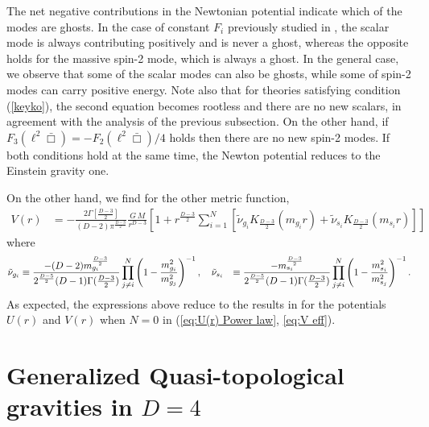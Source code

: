 \documentclass[11pt]{article}
\newcommand{\comment}[1]{{\bf [[[#1]]]}}
\begin{document}
{The net negative contributions in the Newtonian potential indicate which of the modes are ghosts. In the case of constant $F_i$ previously studied in \cite{Aspects,Sisman:2011gz}, the scalar mode is always contributing positively and is never a ghost, whereas the opposite holds for the massive spin-2 mode, which is always a ghost. In the general case, we observe that some of the scalar modes can also be ghosts, while some of spin-2 modes can carry positive energy.
Note also that for theories satisfying condition (\ref{keyko}), the second equation becomes rootless and there are no new scalars, in agreement with the analysis of the previous subsection. On the other hand, if $F_3(\ell^2 \bar \Box)=-F_2(\ell^2 \bar \Box)/4$ holds then there are no new spin-2 modes. If both conditions hold at the same time, the Newton potential reduces to the Einstein gravity one.

On the other hand, we find for the other metric function,
\begin{equation}\label{eq:V eff}
\begin{aligned}
V(r)&=-\frac{2\Gamma[\frac{D-3}{2}]}{(D-2)  \pi^{\frac{D-3}{2}}}  \frac{G\,M}{r^{D-3}}\left[1+r^{\frac{D-3}{2}}\sum_{i=1}^N\left[\tilde{\nu}_{g_{i}}K_{\frac{D-3}{2}}(m_{g_i} r)+\tilde{\nu}_{s_{i}}K_{\frac{D-3}{2}}(m_{s_i} r) \right]\right]\,
\end{aligned}
\end{equation}
where
\begin{align}
\tilde{\nu}_{g_{i}}&\equiv\frac{- (D-2)m_{g_i}^{\frac{D-3}{2}}}{2^{\frac{D-5}{2}}(D-1)\Gamma(\tfrac{D-3}{2})}\prod_{j\neq i}^N\qty(1-\frac{m_{g_i}^2}{m_{g_j}^2})^{-1}\, , \quad
\tilde{\nu}_{s_{i}}&\equiv\frac{-m_{s_i}^{\frac{D-3}{2}}}{2^{\frac{D-5}{2}}(D-1)\Gamma(\tfrac{D-3}{2})}\prod_{j\neq i}^N\qty(1-\frac{m_{s_i}^2}{m_{s_j}^2})^{-1}\, .
\end{align}
As expected, the expressions above reduce to the results in \cite{Aspects} for the potentials $U(r)$ and $V(r)$ when $N=0$ in (\ref{eq:U(r) Power law}, \ref{eq:V eff}).

\section{Generalized Quasi-topological gravities in $D=4$}\label{gqT}

}
\end{document}
